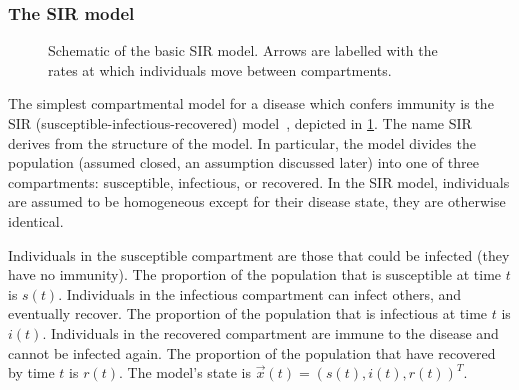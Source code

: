 \documentclass[thesis.tex]{subfiles}
\begin{document}
\subsubsection{The SIR model} \label{SEIR:sec:SIR}

\begin{figure}[h]
  \caption[The SIR model]{Schematic of the basic SIR model. Arrows are labelled with the rates at which individuals move between compartments.}
  \label{SEIR:fig:SIR}
\end{figure}

The simplest compartmental model for a disease which confers immunity is the SIR (susceptible-infectious-recovered) model~\autocite[15]{keelingModeling}, depicted in \cref{SEIR:fig:SIR}.
The name SIR derives from the structure of the model.
In particular, the model divides the population (assumed closed, an assumption discussed later) into one of three compartments: susceptible, infectious, or recovered.
In the SIR model, individuals are assumed to be homogeneous except for their disease state, \ie they are otherwise identical.

Individuals in the susceptible compartment are those that could be infected (they have no immunity).
The proportion of the population that is susceptible at time $t$ is $s(t)$.
Individuals in the infectious compartment can infect others, and eventually recover.
The proportion of the population that is infectious at time $t$ is $i(t)$.
Individuals in the recovered compartment are immune to the disease and cannot be infected again.
The proportion of the population that have recovered by time $t$ is $r(t)$.
The model's state is $\vec{x}(t) = (s(t), i(t), r(t))^T$.
\end{document}
